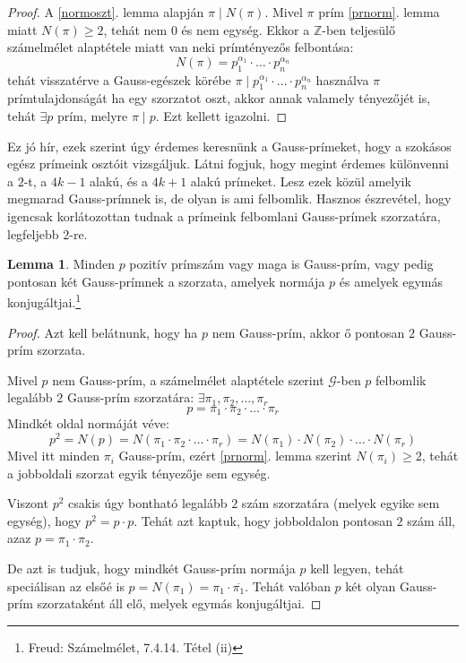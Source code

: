 \documentclass[12pt]{book}
\theoremstyle{plain} %
\theoremstyle{definition} %
\newtheorem{lem/}{Lemma}[section]
\newenvironment{lem}
  {\renewcommand{\qedsymbol}{$\clubsuit$}%
   \pushQED{\qed}\begin{lem/}}
  {\popQED\end{lem/}}
\theoremstyle{remark}
\renewcommand\qedsymbol{$\blacksquare$}
\numberwithin{equation}{section}  %
\def\Z{\mathbb{Z}}
\def\G{\mathcal{G}}
\begin{document}
	\begin{proof}
		A \ref{normoszt}. lemma alapján $\pi \mid N(\pi)$. Mivel $\pi$ prím \ref{prnorm}. lemma miatt $N(\pi)\geq 2$, tehát nem $0$ és nem egység. Ekkor a $\Z$-ben teljesülő számelmélet alaptétele miatt van neki prímtényezős felbontása:
		\[ N(\pi) = p_1^{\alpha_1} \cdot \ldots \cdot p_n^{\alpha_n}  \]
		tehát visszatérve a Gauss-egészek körébe $\pi \mid p_1^{\alpha_1} \cdot \ldots \cdot p_n^{\alpha_n} $
		használva $\pi$ prímtulajdonságát ha egy szorzatot oszt, akkor annak valamely tényezőjét is, tehát $\exists p$ prím, melyre $\pi \mid p$. Ezt kellett igazolni.
	\end{proof}
	
	Ez jó hír, ezek szerint úgy érdemes keresnünk a Gauss-prímeket, hogy a szokásos egész prímeink osztóit vizsgáljuk. Látni fogjuk, hogy megint érdemes különvenni a $2$-t, a $4k-1$ alakú, és a $4k+1$ alakú prímeket. Lesz ezek közül amelyik megmarad Gauss-prímnek is, de olyan is ami felbomlik. Hasznos észrevétel, hogy igencsak korlátozottan tudnak a prímeink felbomlani Gauss-prímek szorzatára, legfeljebb $2$-re.
	
	\begin{lem}\label{gpl2}
		Minden $p$ pozitív prímszám vagy maga is Gauss-prím, vagy pedig pontosan két Gauss-prímnek a szorzata, amelyek normája $p$ és amelyek egymás konjugáltjai.\footnote{Freud: Számelmélet, 7.4.14. Tétel (ii)}
	\end{lem}

	\begin{proof}
		Azt kell belátnunk, hogy ha $p$ nem Gauss-prím, akkor ő pontosan $2$ Gauss-prím szorzata.
		
		Mivel $p$ nem Gauss-prím, a számelmélet alaptétele szerint $\G$-ben $p$ felbomlik legalább $2$ Gauss-prím szorzatára: $\exists \pi_1,\pi_2,\ldots,\pi_r$
		\[ p = \pi_1 \cdot \pi_2 \cdot \ldots \cdot \pi_r  \]
		Mindkét oldal normáját véve:
		\[ p^2=N(p) = N(\pi_1 \cdot \pi_2 \cdot \ldots \cdot \pi_r) = N(\pi_1) \cdot N(\pi_2)\cdot \ldots \cdot N(\pi_r) \]
		Mivel itt minden $\pi_i$ Gauss-prím, ezért \ref{prnorm}. lemma szerint $N(\pi_i)\geq 2$, tehát a jobboldali szorzat egyik tényezője sem egység.
		
		Viszont $p^2$ csakis úgy bontható legalább $2$ szám szorzatára (melyek egyike sem egység), hogy $p^2 = p\cdot p$. Tehát azt kaptuk, hogy jobboldalon pontosan $2$ szám áll, azaz $p=\pi_1\cdot \pi_2$.
		
		De azt is tudjuk, hogy mindkét Gauss-prím normája $p$ kell legyen, tehát speciálisan az elsőé is $p = N(\pi_1) = \pi_1 \cdot \overline{\pi_1} $. Tehát valóban $p$ két olyan Gauss-prím szorzataként áll elő, melyek egymás konjugáltjai.
	\end{proof}
\end{document}
